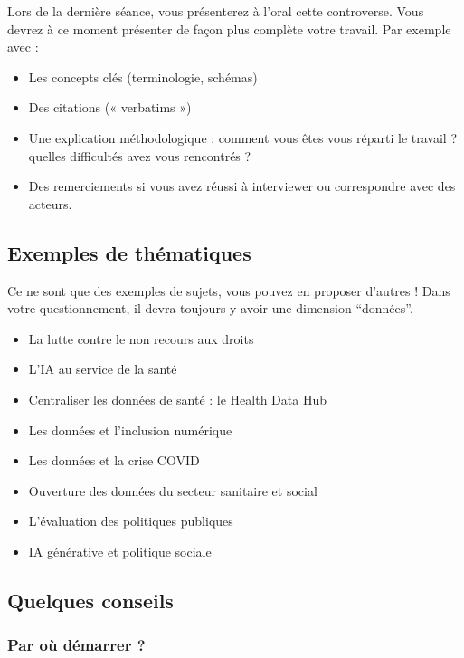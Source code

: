 \documentclass[
  letterpaper,
  DIV=11,
  numbers=noendperiod]{scrreprt}
\begin{document}
Lors de la dernière séance, vous présenterez à l'oral cette controverse.
Vous devrez à ce moment présenter de façon plus complète votre travail.
Par exemple avec :

\begin{itemize}
\item
  Les concepts clés (terminologie, schémas)
\item
  Des citations (« verbatims »)
\item
  Une explication méthodologique : comment vous êtes vous réparti le
  travail ? quelles difficultés avez vous rencontrés ?
\item
  Des remerciements si vous avez réussi à interviewer ou correspondre
  avec des acteurs.
\end{itemize}

\hypertarget{exemples-de-thuxe9matiques}{%
\subsection{Exemples de thématiques}\label{exemples-de-thuxe9matiques}}

Ce ne sont que des exemples de sujets, vous pouvez en proposer d'autres
! Dans votre questionnement, il devra toujours y avoir une dimension
``données''.

\begin{itemize}
\item
  La lutte contre le non recours aux droits
\item
  L'IA au service de la santé
\item
  Centraliser les données de santé : le Health Data Hub
\item
  Les données et l'inclusion numérique
\item
  Les données et la crise COVID
\item
  Ouverture des données du secteur sanitaire et social
\item
  L'évaluation des politiques publiques
\item
  IA générative et politique sociale
\end{itemize}

\hypertarget{quelques-conseils}{%
\subsection{Quelques conseils}\label{quelques-conseils}}

\hypertarget{par-ouxf9-duxe9marrer}{%
\subsubsection{Par où démarrer ?}\label{par-ouxf9-duxe9marrer}}
\end{document}

